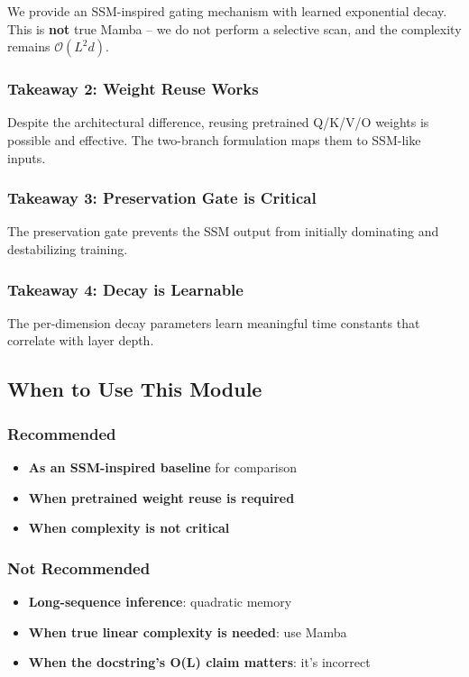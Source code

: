 We provide an SSM-inspired gating mechanism with learned exponential decay. 
This is \textbf{not} true Mamba -- we do not perform a selective scan, and the 
complexity remains $\mathcal{O}(L^2 d)$.

\subsubsection{Takeaway 2: Weight Reuse Works}

Despite the architectural difference, reusing pretrained Q/K/V/O weights is 
possible and effective. The two-branch formulation maps them to SSM-like 
inputs.

\subsubsection{Takeaway 3: Preservation Gate is Critical}

The preservation gate prevents the SSM output from initially dominating and 
destabilizing training.

\subsubsection{Takeaway 4: Decay is Learnable}

The per-dimension decay parameters learn meaningful time constants that 
correlate with layer depth.

\subsection{When to Use This Module}

\subsubsection{Recommended}
\begin{itemize}
\item \textbf{As an SSM-inspired baseline} for comparison
\item \textbf{When pretrained weight reuse is required}
\item \textbf{When complexity is not critical}

\end{itemize}
\subsubsection{Not Recommended}
\begin{itemize}
\item \textbf{Long-sequence inference}: quadratic memory
\item \textbf{When true linear complexity is needed}: use Mamba
\item \textbf{When the docstring's O(L) claim matters}: it's incorrect

\end{itemize}
